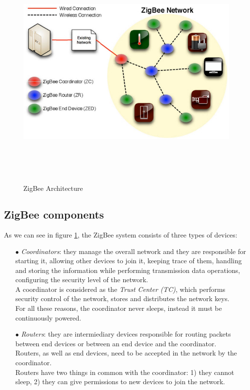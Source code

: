 \documentclass[12pt]{report}
\begin{document}
{{\begin{figure}[H]
\includegraphics[width=12cm,height=12cm,keepaspectratio]{zigbee_architecture}
\centering
\caption{ZigBee Architecture}
\label{fig:zigbeearch}
\end{figure}

\bigskip
\subsection{ZigBee components}
\bigskip

As we can see in figure \ref{fig:zigbeearch}, the ZigBee system consists of three types of devices:

\begin{itemize}
\setlength{\itemindent}{+4mm}
\item[$\bullet$] \emph{Coordinators}: they manage the overall network and they are responsible for starting it, allowing other devices to join it, keeping trace of them, handling and storing the information while performing transmission data operations, configuring the security level of the network.\\
A coordinator is considered as the \emph{Trust Center (TC)}, which performs security control of the network, stores and distributes the network keys.\\
For all these reasons, the coordinator never sleeps, instead it must be continuously powered.


\item[$\bullet$] \emph{Routers}: they are intermiediary devices responsible for routing packets between end devices or between an end device and the coordinator.\\
Routers, as well as end devices, need to be accepted in the network by the coordinator.\\
Routers have two things in common with the coordinator: 1) they cannot sleep, 2) they can give permissions to new devices to join the network.


\end{itemize}}}
\end{document}
